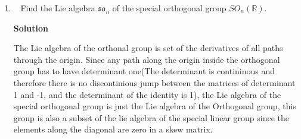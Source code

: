 \documentclass[11pt]{article}
\newcommand\score[1]{\marginpar{\vspace{-2ex}\color{blue}{#1/3}}\hspace{-1ex}}
\newcommand\0{\mathbf{0}}
\newcommand\RR{\mathbb{R}}
\newcommand\SO{\mathit{SO}}
\newcommand\<{\langle}
\renewcommand\>{\rangle}
\begin{document}
\begin{enumerate}
\begin{enumerate}
  \textbf{Solution}

  $$
  \begin{bmatrix}
    99 & 0 &0\\
    0 &9 &0\\
    0 &0 &201
  \end{bmatrix}  
  \begin{bmatrix}
  7 & -16 &8\\
  -16 &7 &-8\\
  8 &-8 &-5
  \end{bmatrix}  
  \begin{bmatrix}
  1/99 & 0 &0\\
  0 &1/9 &0\\
  0 &0 &1/201
  \end{bmatrix}
  =
\begin{bmatrix}
  7 & -176 &\frac{264}{67}\\
  \frac{-16}{11} &7 &\frac{-24}{67}\\      
  \frac{536}{33} &\frac{-536}{3} &-5
\end{bmatrix}  
  $$

  I think so? I don't get a better approximation.

  \item\ \score{}%
  Compute the actual eigenvalues and comment on the quality of your
  estimates in~(a) and~(b).

  \textbf{Solution}

  The eigenvalues are 27, -9. -9. I guess I should have guessed 
  that the two of the eigen values are the same because the disks are the same.
  But I don't have a proof for that. I also see that on eof the eigen values is very far from the center.

  \end{enumerate}

\item\ \score{}%
Find the Lie algebra $\mathfrak{so}_n$ of the special orthogonal group
$\SO_n(\RR)$.

\textbf{Solution}

The Lie algebra of the orthonal group is set of the derivatives of all paths through the origin. Since any 
path along the origin inside the orthogonal group has to have determinant one(The determinant is contininous and therefore there is no
discontinious jump between the matrices of determinant 1 and -1, and the determinant of the identity is 1), the Lie algebra of the special orthogonal group is just 
the Lie algebra of the Orthogonal group, this group is also a subset of the lie algebra of the special linear group since the elements 
along the diagonal are zero in a skew matrix.


\end{enumerate}
\end{document}
